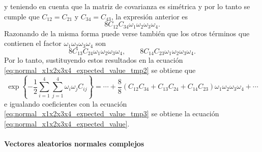 \documentclass[a4paper]{report}
\begin{document}
y teniendo en cuenta que la matriz de covarianza es simétrica y por lo tanto se cumple que \(C_{12}=C_{21}\) y \(C_{34}=C_{43}\), la expresión anterior es 
\[
 8C_{12}C_{34}\omega_1\omega_2\omega_3\omega_4.
\]
Razonando de la misma forma puede verse también que los otros términos que contienen el factor \(\omega_1\omega_2\omega_3\omega_4\) son
\[
 8C_{13}C_{24}\omega_1\omega_2\omega_3\omega_4,\qquad 8C_{14}C_{23}\omega_1\omega_2\omega_3\omega_4.
\]
Por lo tanto, sustituyendo estos resultados en la ecuación \ref{eq:normal_x1x2x3x4_expected_value_tmp2} se obtiene que
\[
 \exp\left\{-\frac{1}{2}\sum_{i=1}^4\sum_{j=1}^4\omega_i\omega_jC_{ij}\right\}=\cdots+\frac{8}{8}(C_{12}C_{34}+C_{13}C_{24}+C_{14}C_{23})\omega_1\omega_2\omega_3\omega_4+\cdots
\]
e igualando coeficientes con la ecuación \ref{eq:normal_x1x2x3x4_expected_value_tmp3} se obtiene la ecuación \ref{eq:normal_x1x2x3x4_expected_value}.

\paragraph{Vectores aleatorios normales complejos}
\end{document}

